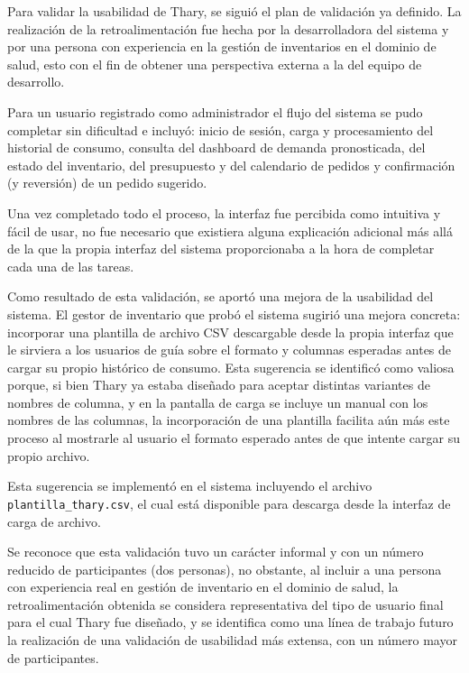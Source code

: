 Para validar la usabilidad de Thary, se siguió el plan de validación ya definido. La realización de la retroalimentación fue hecha por la desarrolladora del sistema y por una persona con experiencia en la gestión de inventarios en el dominio de salud, esto con el fin de obtener una perspectiva externa a la del equipo de desarrollo.

Para un usuario registrado como administrador el flujo del sistema se pudo completar sin dificultad e incluyó: inicio de sesión, carga y procesamiento del historial de consumo, consulta del dashboard de demanda pronosticada, del estado del inventario, del presupuesto y del calendario de pedidos y confirmación (y reversión) de un pedido sugerido. 

Una vez completado todo el proceso, la interfaz fue percibida como intuitiva y fácil de usar, no fue necesario que existiera alguna explicación adicional más allá de la que la propia interfaz del sistema proporcionaba a la hora de completar cada una de las tareas.

Como resultado de esta validación, se aportó una mejora de la usabilidad del sistema. El gestor de inventario que probó el sistema sugirió una mejora concreta: incorporar  una plantilla de archivo CSV descargable desde la propia interfaz que le sirviera a los usuarios de guía sobre el formato y columnas esperadas antes de cargar su propio histórico de consumo.  Esta sugerencia se identificó como valiosa porque, si bien Thary ya estaba diseñado para aceptar distintas variantes de nombres de columna, y en la pantalla de carga se incluye un manual con los nombres de las columnas, la incorporación de una plantilla facilita aún más este proceso al mostrarle al usuario el formato esperado antes de que intente cargar su propio archivo.

Esta sugerencia se implementó en el sistema incluyendo el archivo \texttt{plantilla\_thary.csv}, el cual está disponible para descarga desde la interfaz de carga de archivo.

Se reconoce que esta validación tuvo un carácter informal y con un número reducido de participantes (dos personas), no obstante, al incluir a una persona con experiencia real en gestión de inventario en el dominio de salud, la retroalimentación obtenida se considera representativa del tipo de usuario final para el cual Thary fue diseñado, y se identifica como una línea de trabajo futuro la realización de una validación de usabilidad más extensa, con un número mayor de participantes.